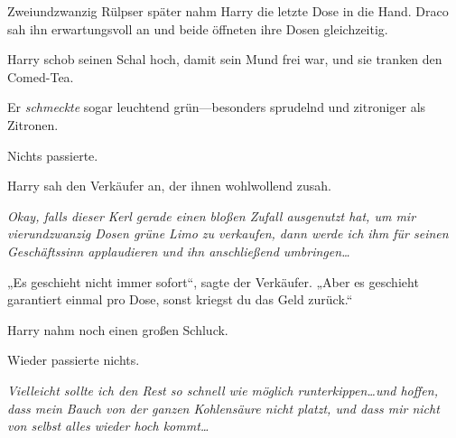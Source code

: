 Zweiundzwanzig Rülpser später nahm Harry die letzte Dose in die Hand. Draco sah ihn erwartungsvoll an und beide öffneten ihre Dosen gleichzeitig.

Harry schob seinen Schal hoch, damit sein Mund frei war, und sie tranken den Comed-Tea.

Er \emph{schmeckte} sogar leuchtend grün—besonders sprudelnd und zitroniger als Zitronen.

Nichts passierte.

Harry sah den Verkäufer an, der ihnen wohlwollend zusah.

\emph{Okay, falls dieser Kerl gerade einen bloßen Zufall ausgenutzt hat, um mir vierundzwanzig Dosen grüne Limo zu verkaufen, dann werde ich ihm für seinen Geschäftssinn applaudieren und ihn anschließend umbringen…}

„Es geschieht nicht immer sofort“, sagte der Verkäufer. „Aber es geschieht garantiert einmal pro Dose, sonst kriegst du das Geld zurück.“

Harry nahm noch einen großen Schluck.

Wieder passierte nichts.

\emph{Vielleicht sollte ich den Rest so schnell wie möglich runterkippen…und hoffen, dass mein Bauch von der ganzen Kohlensäure nicht platzt, und dass mir nicht von selbst alles wieder hoch kommt…}


